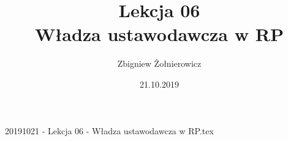 20191021 - Lekcja 06 - Władza ustawodawcza w RP.tex\documentclass[a4paper]{article}
\begin{document}
\title{{\huge Lekcja 06} \\
{\large Władza ustawodawcza w RP}}
\author{Zbigniew Żołnierowicz}
\date{21.10.2019}
\maketitle
\end{document}
